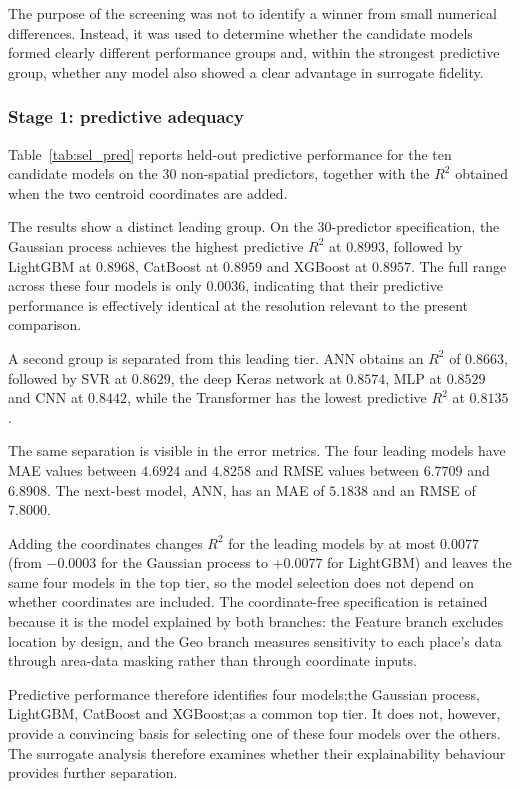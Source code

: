 The purpose of the screening was not to identify a winner from small numerical differences. Instead, it was used to determine whether the candidate models formed clearly different performance groups and, within the strongest predictive group, whether any model also showed a clear advantage in surrogate fidelity.

\subsubsection{Stage 1: predictive adequacy}
\label{sec}

Table~\ref{tab:sel_pred} reports held-out predictive performance for the ten candidate models on the 30 non-spatial predictors, together with the $R^2$ obtained when the two centroid coordinates are added.

The results show a distinct leading group. On the 30-predictor specification, the Gaussian process achieves the highest predictive $R^2$ at $0.8993$, followed by LightGBM at $0.8968$, CatBoost at $0.8959$ and XGBoost at $0.8957$. The full range across these four models is only $0.0036$, indicating that their predictive performance is effectively identical at the resolution relevant to the present comparison.

A second group is separated from this leading tier. ANN obtains an $R^2$ of $0.8663$, followed by SVR at $0.8629$, the deep Keras network at $0.8574$, MLP at $0.8529$ and CNN at $0.8442$, while the Transformer has the lowest predictive $R^2$ at $0.8135$.

The same separation is visible in the error metrics. The four leading models have MAE values between $4.6924$ and $4.8258$ and RMSE values between $6.7709$ and $6.8908$. The next-best model, ANN, has an MAE of $5.1838$ and an RMSE of $7.8000$.

Adding the coordinates changes $R^2$ for the leading models by at most $0.0077$ (from $-0.0003$ for the Gaussian process to $+0.0077$ for LightGBM) and leaves the same four models in the top tier, so the model selection does not depend on whether coordinates are included. The coordinate-free specification is retained because it is the model explained by both branches: the Feature branch excludes location by design, and the Geo branch measures sensitivity to each place's data through area-data masking rather than through coordinate inputs.

Predictive performance therefore identifies four models;the Gaussian process, LightGBM, CatBoost and XGBoost;as a common top tier. It does not, however, provide a convincing basis for selecting one of these four models over the others. The surrogate analysis therefore examines whether their explainability behaviour provides further separation.

